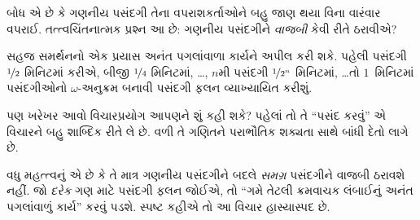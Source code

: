 \documentclass[../../../include/open-logic-section]{subfiles}
\begin{document}
બોધ એ છે કે ગણનીય પસંદગી તેના
વપરાશકર્તાઓને બહુ જાણ થયા વિના
વારંવાર વપરાઈ. તત્ત્વચિંતનાત્મક પ્રશ્ન
આ છે: ગણનીય પસંદગીને \emph{વાજબી}
કેવી રીતે ઠરાવીએ?

સહજ સમર્થનનો એક પ્રયાસ અનંત પગલાંવાળા
કાર્યને અપીલ કરી શકે. પહેલી પસંદગી
$\nicefrac{1}{2}$ મિનિટમાં કરીએ, બીજી
$\nicefrac{1}{4}$ મિનિટમાં, \dots,
$n$મી પસંદગી $\nicefrac{1}{2^n}$
મિનિટમાં, \dots\@ તો $1$~મિનિટમાં
પસંદગીઓનો $\omega$-અનુક્રમ બનાવી
પસંદગી ફલન વ્યાખ્યાયિત કરીશું.

પણ ખરેખર આવો વિચારપ્રયોગ આપણને
શું કહી શકે? પહેલાં તો તે ``પસંદ કરવું''
એ વિચારને બહુ શાબ્દિક રીતે લે છે.
વળી તે ગણિતને પરાભૌતિક શક્યતા
સાથે બાંધી દેતો લાગે છે.

વધુ મહત્ત્વનું એ છે કે તે માત્ર
ગણનીય પસંદગીને બદલે \emph{સમગ્ર}
પસંદગીને વાજબી ઠરાવશે નહીં. જો
\emph{દરેક} ગણ માટે પસંદગી ફલન
જોઈએ, તો ``ગમે તેટલી ક્રમવાચક
લંબાઈનું અનંત પગલાંવાળું કાર્ય''
કરવું પડશે. સ્પષ્ટ કહીએ તો આ
વિચાર હાસ્યાસ્પદ છે.
\end{document}
